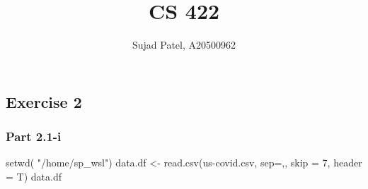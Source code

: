 \documentclass[
]{article}
\title{CS 422}
\author{Sujad Patel, A20500962}
\date{}
\newenvironment{Shaded}{\begin{snugshade}}{\end{snugshade}}
\newcommand{\AttributeTok}[1]{\textcolor[rgb]{0.77,0.63,0.00}{#1}}
\newcommand{\DecValTok}[1]{\textcolor[rgb]{0.00,0.00,0.81}{#1}}
\newcommand{\FunctionTok}[1]{\textcolor[rgb]{0.00,0.00,0.00}{#1}}
\newcommand{\NormalTok}[1]{#1}
\newcommand{\OtherTok}[1]{\textcolor[rgb]{0.56,0.35,0.01}{#1}}
\newcommand{\StringTok}[1]{\textcolor[rgb]{0.31,0.60,0.02}{#1}}
\begin{document}
\maketitle

{
\setcounter{tocdepth}{2}
\tableofcontents
}
\hypertarget{exercise-2}{%
\subsection{Exercise 2}\label{exercise-2}}

\hypertarget{part-2.1-i}{%
\subsubsection{Part 2.1-i}\label{part-2.1-i}}

\begin{Shaded}
\begin{Highlighting}[]
\FunctionTok{setwd}\NormalTok{( }\StringTok{"/home/sp\_wsl"}\NormalTok{)}
\NormalTok{data.df }\OtherTok{\textless{}{-}} \FunctionTok{read.csv}\NormalTok{(}\StringTok{\textquotesingle{}us{-}covid.csv\textquotesingle{}}\NormalTok{, }\AttributeTok{sep=}\StringTok{\textquotesingle{},\textquotesingle{}}\NormalTok{, }\AttributeTok{skip =} \DecValTok{7}\NormalTok{, }\AttributeTok{header =}\NormalTok{ T)}
\NormalTok{data.df}
\end{Highlighting}
\end{Shaded}
\end{document}

